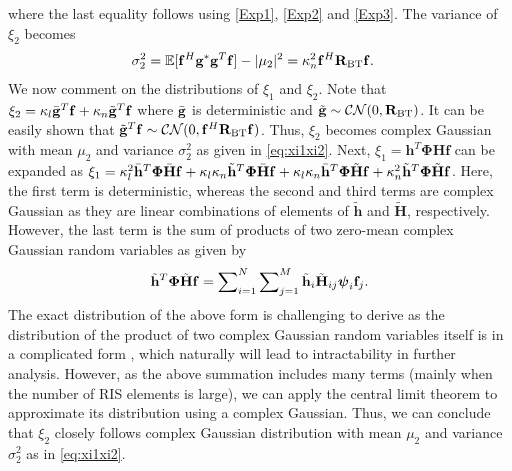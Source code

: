 \documentclass[journal,draftclsnofoot,onecolumn,12pt]{IEEEtran}
\begin{document}
 where the last equality follows using \eqref{Exp1}, \eqref{Exp2} and \eqref{Exp3}. The variance of $\xi_2$ becomes 
 \begin{align}
     \sigma_2^2&=\mathbb{E}[\mathbf{f}^H\mathbf{{g}}^*\mathbf{{g}}^T\mathbf{f}]-|\mu_2|^2=\kappa_n^2\mathbf{f}^H\mathbf{R}_{\rm BT}\mathbf{f}.
 \end{align}
We now comment on the distributions of $\xi_1$ and $\xi_2$. Note that $\xi_2 = \kappa_l \Bar{\mathbf{g}}^T\mathbf{f} + \kappa_n \Tilde{\mathbf{g}}^T\mathbf{f}$ 
where $\Bar{\mathbf{g}}$ is deterministic and $\Tilde{\mathbf{g}} \sim \mathcal{CN}(0, \mathbf{R}_{\rm BT})$. It can be easily shown that $\Tilde{\mathbf{g}}^T\mathbf{f} \sim \mathcal{CN}(0, \mathbf{f}^H\mathbf{R}_{\rm BT}\mathbf{f})$. Thus,  $\xi_2$ becomes complex Gaussian with mean $\mu_2$ and variance $\sigma^2_2$ as given in \eqref{eq:xi1xi2}.
Next, $\xi_1=\mathbf{h}^T\mathbf{\Phi}{\mathbf{H}}\mathbf{f}$ can be expanded as 
$\xi_1  = \kappa_l^2 \Bar{\mathbf{h}}^T\mathbf{\Phi}\Bar{\mathbf{H}}\mathbf{f}  +  \kappa_l \kappa_n \Tilde{\mathbf{h}}^T\mathbf{\Phi}\Bar{\mathbf{H}}\mathbf{f}  +  \kappa_l \kappa_n \Bar{\mathbf{h}}^T\mathbf{\Phi}\Tilde{\mathbf{H}}\mathbf{f}  +  \kappa_n^2\Tilde{\mathbf{h}}^T\mathbf{\Phi}\Tilde{\mathbf{H}}\mathbf{f}$.
Here, the first term is deterministic, whereas the  second and third terms are complex Gaussian as they are linear combinations of elements of $\tilde{\mathbf{h}}$ and $\tilde{\mathbf{H}}$, respectively. 
However, the last term is the sum of products of two zero-mean complex Gaussian random variables as given by 
$$\Tilde{\mathbf{h}}^T\mathbf{\Phi}\Tilde{\mathbf{H}}\mathbf{f} = \sum\nolimits_{i = 1}^N \sum\nolimits_{j = 1}^M \Tilde{\mathbf{h}}_i \Tilde{\mathbf{H}}_{ij} \mathbf{\boldsymbol{\psi}}_i \mathbf{f}_j.$$
The exact distribution of the above form is challenging to derive  as the distribution of the product of two complex Gaussian random variables itself is in a complicated form \cite{Donoughue_GuassianProduct}, which naturally will lead to intractability in further analysis. However, as the above summation includes many terms (mainly when the number of RIS elements is large),  we can apply the central limit theorem to approximate its distribution  using a complex Gaussian. Thus, we can conclude that $\xi_2$ closely follows complex Gaussian distribution with mean $\mu_2$ and variance $\sigma^2_2$ as in \eqref{eq:xi1xi2}.
\end{document}
